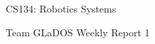 \documentclass[12 pt]{article}
\newcommand{\setnum}{1}
\begin{document}
\begin{center}
    \Large \color{blue} CS134: Robotics Systems\color{black}
    \begin{center}\normalsize Team GLaDOS Weekly Report \setnum{}\end{center}
    \noindent{\color{black} \rule{\linewidth}{0.5mm} }
\end{center}

\end{document}
